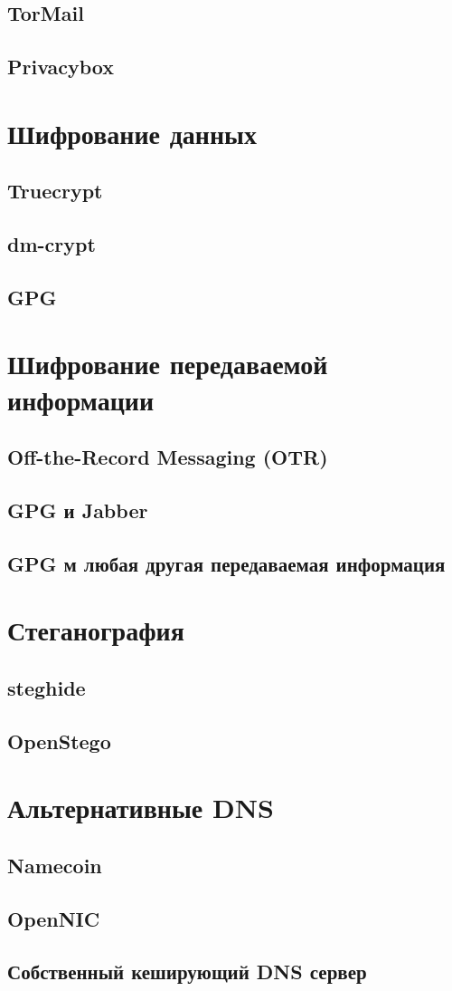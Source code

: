 \subsection{TorMail}
\subsection{Privacybox}

\section{Шифрование данных}
\subsection{Truecrypt}
\subsection{dm-crypt}
\subsection{GPG}

\section{Шифрование передаваемой информации}
\subsection{Off-the-Record Messaging (OTR)}
\subsection{GPG и Jabber}
\subsection{GPG м любая другая передаваемая информация}

\section{Стеганография}
\subsection{steghide}
\subsection{OpenStego}

\section{Альтернативные DNS}
\subsection{Namecoin}
\subsection{OpenNIC}
\subsection{Собственный кеширующий DNS сервер}
